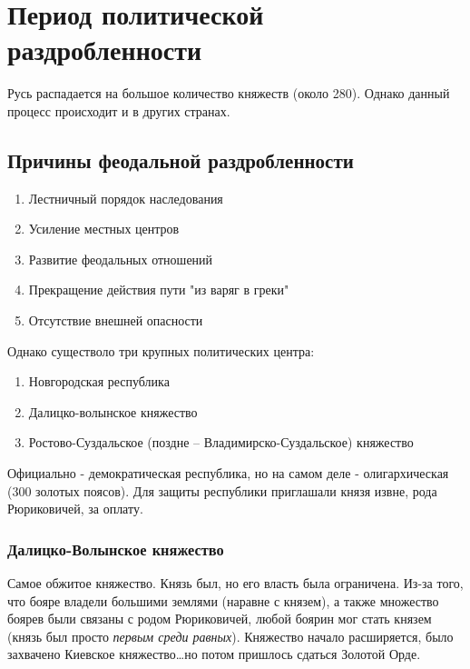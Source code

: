 \section{Период политической раздробленности}

Русь распадается на большое количество княжеств (около 280). Однако данный процесс происходит и в других странах.

\subsection{Причины феодальной раздробленности}

\begin{enumerate}
  \item Лестничный порядок наследования
  \item Усиление местных центров
  \item Развитие феодальных отношений
  \item Прекращение действия пути "из варяг в греки"
  \item Отсутствие внешней опасности
\end{enumerate}

Однако существоло три крупных политических центра:
\begin{enumerate}
  \item Новгородская республика
  \item Далицко-волынское княжество
  \item Ростово-Суздальское (поздне -- Владимирско-Суздальское) княжество
\end{enumerate}


Официально - демократическая республика, но на самом деле - олигархическая (300 золотых поясов). Для защиты республики приглашали князя извне, рода Рюриковичей, за оплату.

\subsubsection{Далицко-Волынское княжество}

Самое обжитое княжество. Князь был, но его власть была ограничена. Из-за того, что бояре владели большими землями (наравне с князем), а также множество боярев были связаны с родом Рюриковичей, любой боярин мог стать князем (князь был просто \textit{первым среди равных}).
Княжество начало расширяется, было захвачено Киевское княжество\ldots но потом пришлось сдаться Золотой Орде. 

